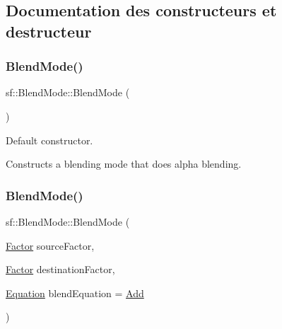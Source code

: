\subsection{Documentation des constructeurs et destructeur}
\mbox{\label{structsf_1_1BlendMode_a7faef75eae1fb47bbe93f45f38e3d345}} 
\subsubsection{\texorpdfstring{Blend\+Mode()}{BlendMode()}\hspace{0.1cm}{\footnotesize\ttfamily [1/3]}}
{\footnotesize\ttfamily sf\+::\+Blend\+Mode\+::\+Blend\+Mode (\begin{DoxyParamCaption}{ }\end{DoxyParamCaption})}



Default constructor. 

Constructs a blending mode that does alpha blending. \mbox{\label{structsf_1_1BlendMode_a23c7452cc8e9eb943c3aea6234ce4297}} 
\subsubsection{\texorpdfstring{Blend\+Mode()}{BlendMode()}\hspace{0.1cm}{\footnotesize\ttfamily [2/3]}}
{\footnotesize\ttfamily sf\+::\+Blend\+Mode\+::\+Blend\+Mode (\begin{DoxyParamCaption}\item[{\hyperlink{structsf_1_1BlendMode_afb9852caf356b53bb0de460c58a9ebbb}{Factor}}]{source\+Factor,  }\item[{\hyperlink{structsf_1_1BlendMode_afb9852caf356b53bb0de460c58a9ebbb}{Factor}}]{destination\+Factor,  }\item[{\hyperlink{structsf_1_1BlendMode_a7bce470e2e384c4f9c8d9595faef7c32}{Equation}}]{blend\+Equation = {\ttfamily \hyperlink{structsf_1_1BlendMode_a7bce470e2e384c4f9c8d9595faef7c32a50c081d8f36cf7b77632966e15d38966}{Add}} }\end{DoxyParamCaption})}




